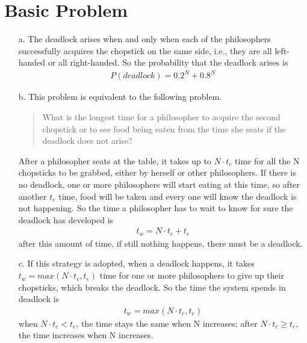 \documentclass[12pt,letterpaper]{article}
\begin{document}
\section*{Basic Problem}
\begin{itemize}
\item[a.] The deadlock arises when and only when each of the philosophers successfully acquires the chopstick on the same side, i.e., they are all left-handed or all right-handed. So the probability that the deadlock arises is
\begin{align}
P(deadlock) = 0.2^N + 0.8^N
\end{align}
\item[b.] This problem is equivalent to the following problem.
\begin{quote}
What is the longest time for a philosopher to acquire the second chopstick or to see food being eaten from the time she seats if the deadlock does not arise?
\end{quote}
After a philosopher seats at the table, it takes up to $N\cdot t_c$ time for all the N chopsticks to be grabbed, either by herself or other philosophers. If there is no deadlock, one or more philosophers will start eating at this time, so after another $t_e$ time, food will be taken and every one will know the deadlock is not happening. So the time a philosopher has to wait to know for sure the deadlock has developed is
\begin{align}
t_w = N\cdot t_c+t_e
\end{align}
after this amount of time, if still nothing happens, there must be a deadlock.
\item[c.] If this strategy is adopted, when a deadlock happens, it takes $t_w = max(N\cdot t_c,t_e)$ time for one or more philosophers to give up their chopsticks, which breaks the deadlock. So the time the system spends in deadlock is
\begin{align}
t_w = max(N\cdot t_c,t_e)
\end{align}
when $N\cdot t_c<t_e$, the time stays the same when N increases; after $N\cdot t_c\ge t_e$, the time increases when N increases.
\end{itemize}
\end{document}
